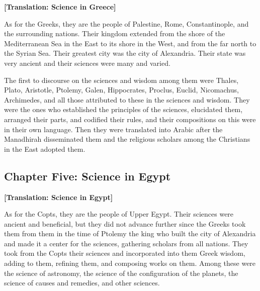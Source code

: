 \documentclass[11pt,a4paper]{article}
\begin{document}
\bigskip

\noindent\textbf{[Translation: Science in Greece]}

As for the Greeks, they are the people of Palestine, Rome, Constantinople, and the surrounding nations. Their kingdom extended from the shore of the Mediterranean Sea in the East to its shore in the West, and from the far north to the Syrian Sea. Their greatest city was the city of Alexandria. Their state was very ancient and their sciences were many and varied.

The first to discourse on the sciences and wisdom among them were Thales, Plato, Aristotle, Ptolemy, Galen, Hippocrates, Proclus, Euclid, Nicomachus, Archimedes, and all those attributed to these in the sciences and wisdom. They were the ones who established the principles of the sciences, elucidated them, arranged their parts, and codified their rules, and their compositions on this were in their own language. Then they were translated into Arabic after the Manadhirah disseminated them and the religious scholars among the Christians in the East adopted them.

\clearpage

\subsection*{Chapter Five: Science in Egypt}

{\arabicfont{}}

\bigskip

\noindent\textbf{[Translation: Science in Egypt]}

As for the Copts, they are the people of Upper Egypt. Their sciences were ancient and beneficial, but they did not advance further since the Greeks took them from them in the time of Ptolemy the king who built the city of Alexandria and made it a center for the sciences, gathering scholars from all nations. They took from the Copts their sciences and incorporated into them Greek wisdom, adding to them, refining them, and composing works on them. Among these were the science of astronomy, the science of the configuration of the planets, the science of causes and remedies, and other sciences.
\end{document}
